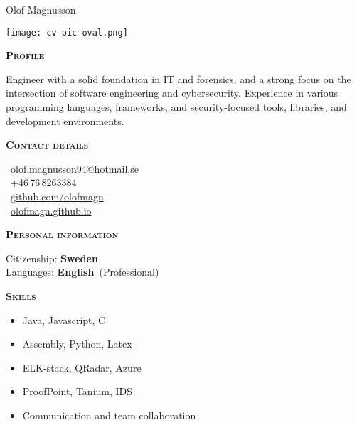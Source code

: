 \documentclass[11pt, a4paper]{article}
\newcommand{\headleft}[1]{\vspace*{3ex}\textsc{\textbf{#1}}\par%
    \vspace*{-1.5ex}\hrulefill\par\vspace*{0.7ex}}
\begin{document}
\setlength{\topskip}{0pt}
\setlength{\parindent}{0pt}
\setlength{\parskip}{0pt}
\setlength{\fboxsep}{0pt}
\pagestyle{empty}
\raggedbottom

\begin{minipage}[t]{0.33\textwidth} %
\colorbox{cvblue}{\begin{minipage}[t][5mm][t]{\textwidth}\null\hfill\null\end{minipage}}

\vspace{-.2ex} %
\colorbox{cvblue!90}{\color{white}  %
\textwidth\relax%
\begin{minipage}[t][293mm][t]{0.82\textwidth}
\raggedright
\vspace*{2.5ex}

\Large Olof Magnusson \normalsize 

\null\hfill\texttt{[image: cv-pic-oval.png]}\hfill\null

\vspace*{0.5ex} %

\headleft{Profile}
Engineer with a solid foundation in IT and forensics, and a strong focus on the intersection of software engineering and cybersecurity. Experience in various programming languages, frameworks, and security-focused tools, libraries, and development environments.

\headleft{Contact details}
\small %
\MVAt\ {\small olof.magnusson94@hotmail.se} \\[0.5ex]
\Mobilefone \ +46\,76\,8263384 \\[0.5ex]
\Mundus\ \href{https://github.com/olofmagn}{github.com/olofmagn} \\[0.5ex]
\Mundus\ \href{https://olofmagn.github.io/}{olofmagn.github.io} \\
\normalsize

\headleft{Personal information}
Citizenship: \textbf{Sweden} \\[0.5ex]
Languages: \textbf{English}~(Professional)

\headleft{Skills}
\begin{itemize}
\item Java, Javascript, C
\item Assembly, Python, Latex
\item ELK-stack, QRadar, Azure
\item ProofPoint, Tanium, IDS
\item Communication and team collaboration
\end{itemize} 


\end{minipage}}
\end{minipage}
\end{document}
